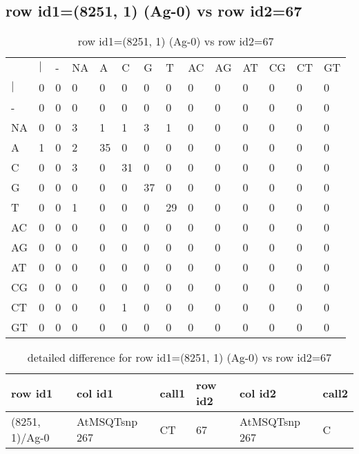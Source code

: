 \subsection{row id1=(8251, 1) (Ag-0) vs row id2=67}
\begin{center}
\begin{longtable}{|l|l|l|l|l|l|l|l|l|l|l|l|l|l|}
\caption{row id1=(8251, 1) (Ag-0) vs row id2=67} \label{table_dm386}\\
\hline
\\
\hline
&$|$&-&NA&A&C&G&T&AC&AG&AT&CG&CT&GT\\
$|$&0&0&0&0&0&0&0&0&0&0&0&0&0\\
-&0&0&0&0&0&0&0&0&0&0&0&0&0\\
NA&0&0&3&1&1&3&1&0&0&0&0&0&0\\
A&1&0&2&35&0&0&0&0&0&0&0&0&0\\
C&0&0&3&0&31&0&0&0&0&0&0&0&0\\
G&0&0&0&0&0&37&0&0&0&0&0&0&0\\
T&0&0&1&0&0&0&29&0&0&0&0&0&0\\
AC&0&0&0&0&0&0&0&0&0&0&0&0&0\\
AG&0&0&0&0&0&0&0&0&0&0&0&0&0\\
AT&0&0&0&0&0&0&0&0&0&0&0&0&0\\
CG&0&0&0&0&0&0&0&0&0&0&0&0&0\\
CT&0&0&0&0&1&0&0&0&0&0&0&0&0\\
GT&0&0&0&0&0&0&0&0&0&0&0&0&0\\
\hline
\end{longtable}
\end{center}

\begin{center}
\begin{longtable}{|l|l|l|l|l|l|}
\caption{detailed difference for row id1=(8251, 1) (Ag-0) vs row id2=67} \label{table_dm387}\\
\hline
row id1&col id1&call1&row id2&col id2&call2\\
\hline
(8251, 1)/Ag-0&AtMSQTsnp 267&CT&67&AtMSQTsnp 267&C\\
\hline
\end{longtable}
\end{center}

